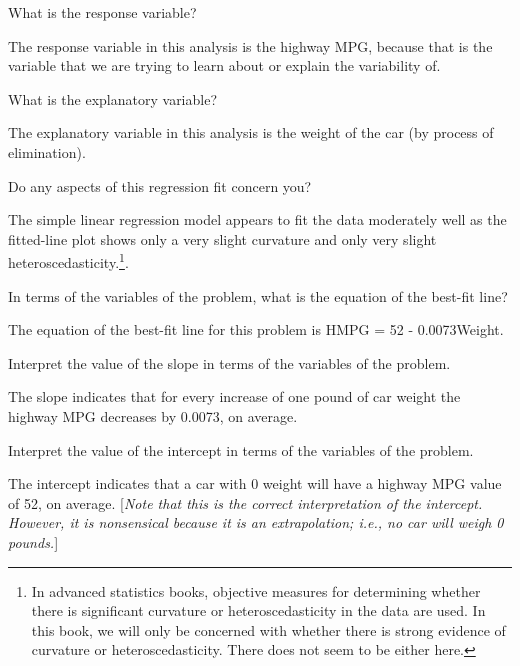 \documentclass[10pt,openany]{book}\usepackage[]{graphicx}\usepackage[]{color}
\begin{document}
\begin{QAlist}
  \item What is the response variable?
  \begin{QAlist}
    \item The response variable in this analysis is the highway MPG, because that is the variable that we are trying to learn about or explain the variability of.
  \end{QAlist}
  \item What is the explanatory variable?
  \begin{QAlist}
    \item The explanatory variable in this analysis is the weight of the car (by process of elimination).
  \end{QAlist}
  \item Do any aspects of this regression fit concern you?
  \begin{QAlist}
    \item The simple linear regression model appears to fit the data moderately well as the fitted-line plot  shows only a very slight curvature and only very slight heteroscedasticity.\footnote{In advanced statistics books, objective measures for determining whether there is significant curvature or heteroscedasticity in the data are used. In this book, we will only be concerned with whether there is strong evidence of curvature or heteroscedasticity. There does not seem to be either here.}.
  \end{QAlist}
  \item In terms of the variables of the problem, what is the equation of the best-fit line?
  \begin{QAlist}
    \item The equation of the best-fit line for this problem is HMPG = 52 - 0.0073Weight.
  \end{QAlist}
  \item Interpret the value of the slope in terms of the variables of the problem.
  \begin{QAlist}
    \item The slope indicates that for every increase of one pound of car weight the highway MPG decreases by 0.0073, on average.
  \end{QAlist}
  \item Interpret the value of the intercept in terms of the variables of the problem.
  \begin{QAlist}
    \item The intercept indicates that a car with 0 weight will have a highway MPG value of 52, on average. [\emph{Note that this is the correct interpretation of the intercept. However, it is nonsensical because it is an extrapolation; i.e., no car will weigh 0 pounds.}]

\end{QAlist}
\end{QAlist}
\end{document}
